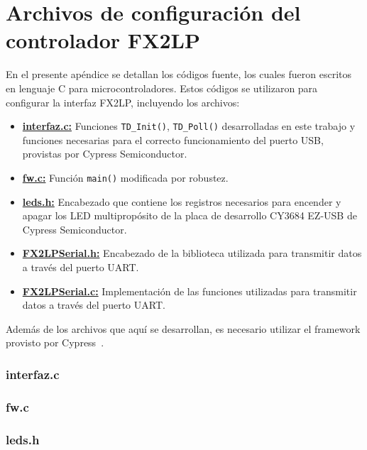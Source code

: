 \chapter{Archivos de configuración del controlador FX2LP}
	\label{ap:fx2lp}
	En el presente apéndice se detallan los códigos fuente, los cuales fueron escritos en lenguaje C para microcontroladores. Estos códigos se utilizaron para configurar la interfaz FX2LP, incluyendo los archivos:
	\begin{itemize}
		\item \hyperref[ap:fx2lp:ifc]{\textbf{interfaz.c:}} Funciones \verb|TD_Init()|, \verb|TD_Poll()| desarrolladas en este trabajo y funciones necesarias para el correcto funcionamiento del puerto USB, provistas por Cypress Semiconductor.
		\item \hyperref[ap:fx2lp:fwc]{\textbf{fw.c:}} Función \verb|main()| modificada por robustez.
		\item \hyperref[ap:fx2lp:ledh]{\textbf{leds.h:}} Encabezado que contiene los registros necesarios para encender y apagar los LED multipropósito de la placa de desarrollo CY3684 EZ-USB de Cypress Semiconductor.
		\item \hyperref[ap:fx2lp:serh]{\textbf{FX2LPSerial.h:}} Encabezado de la biblioteca utilizada para transmitir datos a través del puerto UART.
		\item \hyperref[ap:fx2lp:serc]{\textbf{FX2LPSerial.c:}} Implementación de las funciones utilizadas para transmitir datos a través del puerto UART.
	\end{itemize}
	
	Además de los archivos que aquí se desarrollan, es necesario utilizar el framework provisto por Cypress~\cite{CypressSemiconductor2020}.
	
	\subsection*{interfaz.c}
		\label{ap:fx2lp:ifc}
		
	\subsection*{fw.c}
		\label{ap:fx2lp:fwc}
		
	\subsection*{leds.h}
		\label{ap:fx2lp:ledh}
		
		
